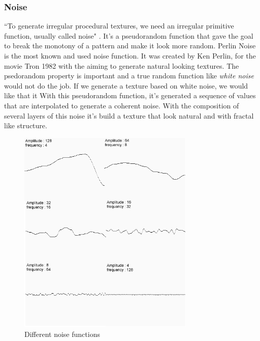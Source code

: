 
\subsubsection{Noise} %
\label{ssub:noise}


``To generate irregular procedural textures, we need an irregular primitive function, usually called noise" \cite{Ebert2002}. It's a pseudorandom function that gave the goal to break the monotony of a pattern and make it look more random.
Perlin Noise is the most known and used noise function. It was created by Ken Perlin, for the movie Tron 1982 with the aiming to generate natural looking textures.
The psedorandom property is important and a true random function like \emph{white noise} would not do the job. If we generate a texture based on white noise, we would like that it 
With this pseudorandom function, it's generated a sequence of values that are interpolated to generate a coherent noise. With the composition of several layers of this noise it's build a texture that look natural and with fractal like structure.


\begin{figure}[htbp]
	\centering
	\includegraphics[width=0.75\textwidth]{img/Theory/Perlin_Noise/Merge.png}
	\caption{Different noise functions}
	\label{fig:merge}
\end{figure}



